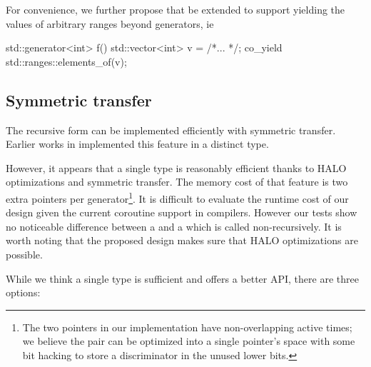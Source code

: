 \documentclass{wg21}
\begin{document}
For convenience, we further propose that  be extended to support
yielding the values of arbitrary ranges beyond generators, ie

\begin{colorblock}
    std::generator<int> f()
    {
        std::vector<int> v = /*... */;
        co_yield std::ranges::elements_of(v);
    }

\end{colorblock}

\subsection{Symmetric transfer}

The recursive form can be implemented efficiently with symmetric transfer.
Earlier works in \cite{CppCoro} implemented this feature in a distinct  type.

However, it appears that a single type is reasonably efficient thanks to HALO optimizations and symmetric transfer.
The memory cost of that feature is two extra pointers per generator\footnote{
The two pointers in our implementation have non-overlapping active times;
we believe the pair can be optimized into a single pointer's space
with some bit hacking to store a discriminator in the unused lower bits.}.
It is difficult to evaluate the runtime cost of our design given the current coroutine support in compilers.
However our tests show no noticeable difference between a  and a 
which is called non-recursively. It is worth noting that the proposed design makes sure that HALO \cite{P0981R0} optimizations are possible.

While we think a single  type is sufficient and offers a better API, there are three options:
\end{document}
